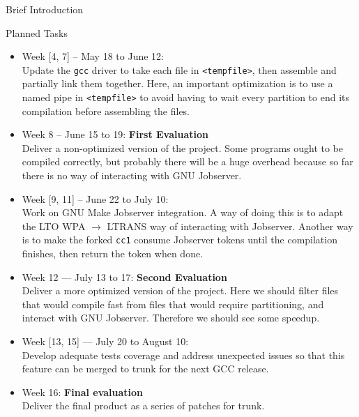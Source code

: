\documentclass[12pt]{article}
\begin{document}
\begin{section}{Brief Introduction}
\begin{section}{Planned Tasks}
\begin{itemize}
 \item{Week [4, 7] -- May 18 to June 12:} \\
  Update the \texttt{gcc} driver to take each file in \texttt{<tempfile>}, then
  assemble and partially link them together. Here, an important optimization is
  to use a named pipe in \texttt{<tempfile>} to avoid having to wait every
  partition to end its compilation before assembling the files.

 \item{Week 8 -- June 15 to 19:} \textbf{First Evaluation} \\
  Deliver a non-optimized version of the project. Some programs ought to be
  compiled correctly, but probably there will be a huge overhead because so far
  there is no way of interacting with GNU Jobserver.

 \item{Week [9, 11] -- June 22 to July 10:} \\
  Work on GNU Make Jobserver integration. A way of doing this is to adapt
  the LTO WPA $\rightarrow$ LTRANS way of interacting with Jobserver. Another
  way is to make the forked \texttt{cc1} consume Jobserver tokens until the
  compilation finishes, then return the token when done.

 \item{Week 12 --- July 13 to 17:} \textbf{Second Evaluation} \\
  Deliver a more optimized version of the project. Here we should filter files
  that would compile fast from files that would require partitioning, and
  interact with GNU Jobserver. Therefore we should see some speedup.

\item{Week [13, 15] --- July 20 to August 10:} \\
  Develop adequate tests coverage and address unexpected issues
  so that this feature can be merged to trunk for the next GCC
  release.

\item{Week 16:} \textbf{Final evaluation}\\
  Deliver the final product as a series of patches for trunk.


\end{itemize}
\end{section}

\end{section}
\end{document}
